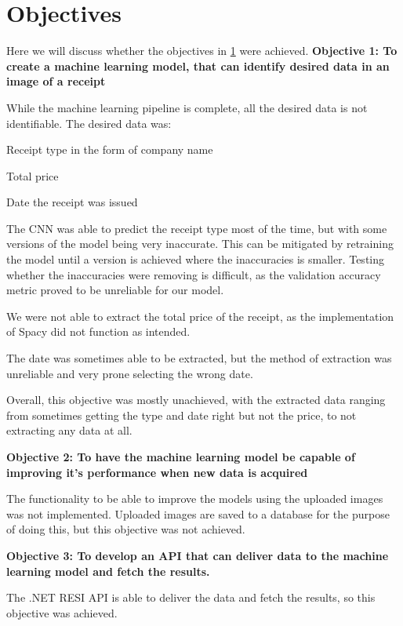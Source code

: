 \section{Objectives}\label{sec:objectives}
Here we will discuss whether the objectives in \ref{sec:objectives} were achieved.
\textbf{Objective 1: To create a machine learning model, that can identify desired data in an image of a receipt}

While the machine learning pipeline is complete, all the desired data is not identifiable.
The desired data was:

\begin{compactitem}
    \item Receipt type in the form of company name
    \item Total price
    \item Date the receipt was issued
\end{compactitem}


The CNN was able to predict the receipt type most of the time, but with some versions of the model being very inaccurate.
This can be mitigated by retraining the model until a version is achieved where the inaccuracies is smaller.
Testing whether the inaccuracies were removing is difficult, as the validation accuracy metric proved to be unreliable for our model.

We were not able to extract the total price of the receipt, as the implementation of Spacy did not function as intended.

The date was sometimes able to be extracted, but the method of extraction was unreliable and very prone selecting the wrong date.

Overall, this objective was mostly unachieved, with the extracted data ranging from sometimes getting the type and date right but not the price, to not extracting any data at all.

\textbf{Objective 2: To have the machine learning model be capable of improving it's performance when new data is acquired}

The functionality to be able to improve the models using the uploaded images was not implemented.
Uploaded images are saved to a database for the purpose of doing this, but this objective was not achieved.

\textbf{Objective 3: To develop an API that can deliver data to the machine learning model and fetch the results.}

The .NET RESI API is able to deliver the data and fetch the results, so this objective was achieved.